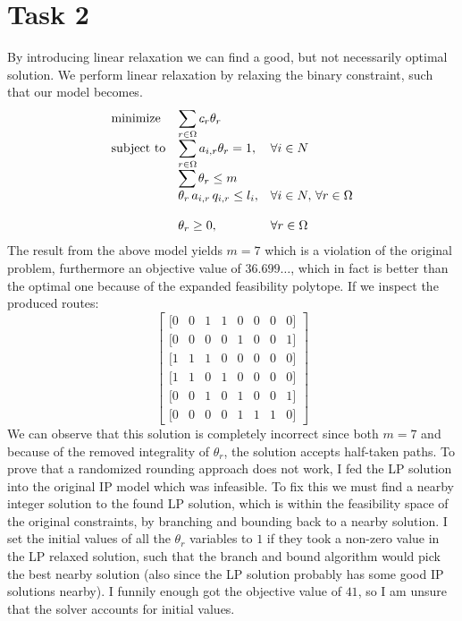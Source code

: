 \documentclass{article}
\begin{document}
    \section*{Task 2}
    By introducing linear relaxation we can find a good, but not necessarily optimal solution.
    We perform linear relaxation by relaxing the binary constraint, such that our model becomes.
    \begin{equation*}
        \begin{array}{ll@{}ll}
            \text{minimize}  & \displaystyle\sum_{r \in \Omega} c_r \theta_r& &\\
            \text{subject to}& \displaystyle\sum_{r \in \Omega} a_{i, r} \theta_r = 1 ,&   &\forall i \in N\\
            & \displaystyle\sum \theta_r \leq m &&\\
            & \displaystyle\theta_r \, a_{i,r} \, q_{i,r} \leq l_i, & & \forall i \in N, \, \forall r \in \Omega\\\\
            & \displaystyle \theta_r  \geq 0,  && \forall r \in \Omega
        \end{array}
    \end{equation*}
    The result from the above model yields $m = 7$ which is a violation of the original problem, furthermore an objective value of $36.699\dots$, which in fact is better than the optimal one because of the expanded feasibility polytope.
    If we inspect the produced routes:
    \[
    \begin{bmatrix}
    [0 & 0 & 1 & 1 & 0 & 0 & 0 & 0] \\
    [0 & 0 & 0 & 0 & 1 & 0 & 0 & 1] \\
    [1 & 1 & 1 & 0 & 0 & 0 & 0 & 0] \\
    [1 & 1 & 0 & 1 & 0 & 0 & 0 & 0] \\
    [0 & 0 & 1 & 0 & 1 & 0 & 0 & 1] \\
    [0 & 0 & 0 & 0 & 1 & 1 & 1 & 0]
    \end{bmatrix}
    \]
    We can observe that this solution is completely incorrect since both $m = 7$ and because of the removed integrality of $\theta_r$, the solution accepts half-taken paths.
    To prove that a randomized rounding approach does not work, I fed the LP solution into the original IP model which was infeasible.
    To fix this we must find a nearby integer solution to the found LP solution, which is within the feasibility space of the original constraints, by branching and bounding back to a nearby solution.
    I set the initial values of all the $\theta_r$ variables to $1$ if they took a non-zero value in the LP relaxed solution, such that the branch and bound algorithm would pick the best nearby solution (also since the LP solution probably has some good IP solutions nearby).
    I funnily enough got the objective value of $41$, so I am unsure that the solver accounts for initial values.\\\\
\end{document}
